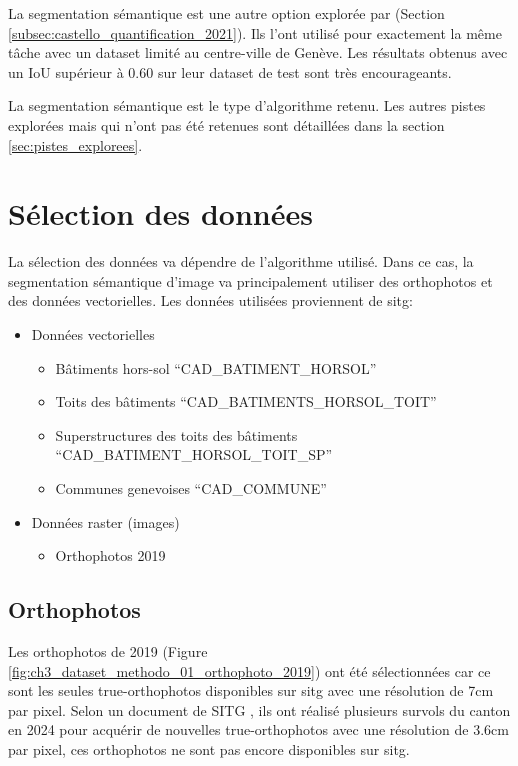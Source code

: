 La segmentation sémantique est une autre option explorée par \citeauthor{castello_quantification_2021} (Section \ref{subsec:castello_quantification_2021}). Ils l'ont utilisé pour exactement la même tâche avec un dataset limité au centre-ville de Genève. Les résultats obtenus avec un IoU supérieur à 0.60 sur leur dataset de test sont très encourageants.

La segmentation sémantique est le type d'algorithme retenu. Les autres pistes explorées mais qui n'ont pas été retenues sont détaillées dans la section \ref{sec:pistes_explorees}.

\section{Sélection des données}
La sélection des données va dépendre de l'algorithme utilisé. Dans ce cas, la segmentation sémantique d'image va principalement utiliser des orthophotos et des données vectorielles. Les données utilisées proviennent de \acrshort{sitg}:
\begin{itemize}
    \item Données vectorielles
    \begin{itemize}
        \item Bâtiments hors-sol ``CAD\_BATIMENT\_HORSOL'' \cite{sitg_batiments_nodate}
        \item Toits des bâtiments ``CAD\_BATIMENTS\_HORSOL\_TOIT'' \cite{sitg_toits_nodate}
        \item Superstructures des toits des bâtiments ``CAD\_BATIMENT\_HORSOL\_TOIT\_SP'' \cite{sitg_superstructures_nodate}
        \item Communes genevoises ``CAD\_COMMUNE'' \cite{sitg_communes_nodate}
    \end{itemize}
    \item Données raster (images)
    \begin{itemize}
        \item Orthophotos 2019 \cite{sitg_orthophotos_nodate}
    \end{itemize}
\end{itemize}

\subsection{Orthophotos}
Les orthophotos de 2019 (Figure \ref{fig:ch3_dataset_methodo_01_orthophoto_2019}) ont été sélectionnées car ce sont les seules true-orthophotos disponibles sur \acrshort{sitg} avec une résolution de 7cm par pixel. Selon un document de SITG \cite{etat_de_geneve_inventaire_2025}, ils ont réalisé plusieurs survols du canton en 2024 pour acquérir de nouvelles true-orthophotos avec une résolution de 3.6cm par pixel, ces orthophotos ne sont pas encore disponibles sur \acrshort{sitg}.

